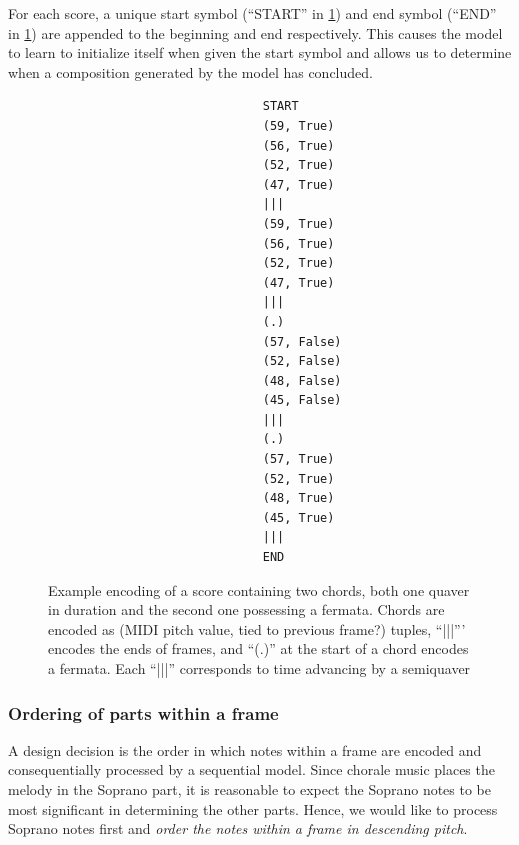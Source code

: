 For each score, a unique start symbol (``START'' in
\cref{fig:eg-encoded-score}) and end symbol (``END'' in
\cref{fig:eg-encoded-score}) are appended to the beginning and end
respectively. This causes the model to learn to initialize itself when given
the start symbol and allows us to determine when a composition generated by the
model has concluded.

\begin{figure}[p]
  \centering
  \begin{verbatim}
                              START
                              (59, True)
                              (56, True)
                              (52, True)
                              (47, True)
                              |||
                              (59, True)
                              (56, True)
                              (52, True)
                              (47, True)
                              |||
                              (.)
                              (57, False)
                              (52, False)
                              (48, False)
                              (45, False)
                              |||
                              (.)
                              (57, True)
                              (52, True)
                              (48, True)
                              (45, True)
                              |||
                              END
  \end{verbatim}
  \caption{Example encoding of a score containing two chords, both one quaver
    in duration and the second one possessing a fermata. Chords are encoded as
    (MIDI pitch value, tied to previous frame?) tuples, ``|||''' encodes the ends
    of frames, and ``(.)'' at the start of a chord encodes a fermata. Each ``|||''
  corresponds to time advancing by a semiquaver}
  \label{fig:eg-encoded-score}
\end{figure}

\subsubsection{Ordering of parts within a frame}\label{sec:ordering-notes-within-frame}

A design decision is the order in which notes within a frame are encoded and
consequentially processed by a sequential model. Since chorale music places the
melody in the Soprano part, it is reasonable to expect the Soprano notes to be
most significant in determining the other parts. Hence, we would like to process
Soprano notes first and \emph{order the notes within a frame in descending pitch}.

